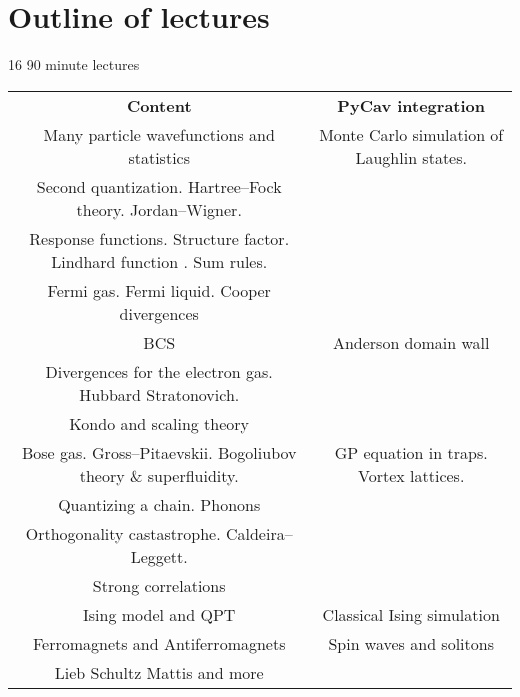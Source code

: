 \section{Outline of lectures}

16 90 minute lectures

\begin{table} 
    \begin{tabular}{ c | c }
     \textbf{Content}   & \textbf{PyCav integration}  \\ 
       Many particle wavefunctions and statistics 
   & Monte Carlo simulation of Laughlin states. \\ 
      Second quantization. Hartree--Fock theory. Jordan--Wigner.  &  \\ 
      Response functions. Structure factor. Lindhard function . Sum rules.     &  \\ 
      Fermi gas. Fermi liquid. Cooper divergences   &  \\ 
      BCS   & Anderson domain wall  \\ 
      Divergences for the electron gas. Hubbard Stratonovich. & \\
      Kondo and scaling theory   &  \\ 
      Bose gas. Gross--Pitaevskii. Bogoliubov theory \& superfluidity.   & GP equation in traps. Vortex lattices. \\ 
      Quantizing a chain. Phonons   &  \\ 
      Orthogonality castastrophe. Caldeira--Leggett.   &  \\ 
      Strong correlations   &  \\ 
      Ising model and QPT   &  Classical Ising simulation \\ 
      Ferromagnets and Antiferromagnets   & Spin waves and solitons \\ 
      Lieb Schultz Mattis and more
    \end{tabular} 
\end{table}

